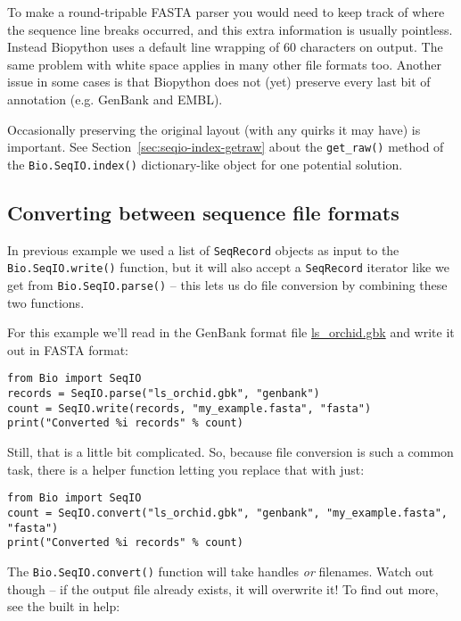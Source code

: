To make a round-tripable FASTA parser you would need to keep track of where the
sequence line breaks occurred, and this extra information is usually pointless.
Instead Biopython uses a default line wrapping of $60$ characters on output.
The same problem with white space applies in many other file formats too.
Another issue in some cases is that Biopython does not (yet) preserve every
last bit of annotation (e.g. GenBank and EMBL).

Occasionally preserving the original layout (with any quirks it may have) is
important. See Section~\ref{sec:seqio-index-getraw} about the \verb|get_raw()|
method of the \verb|Bio.SeqIO.index()| dictionary-like object for one potential
solution.

\subsection{Converting between sequence file formats}
\label{sec:SeqIO-conversion}

In previous example we used a list of \verb|SeqRecord| objects as input to the \verb|Bio.SeqIO.write()| function, but it will also accept a \verb|SeqRecord| iterator like we get from \verb|Bio.SeqIO.parse()| -- this lets us do file conversion by combining these two functions.

For this example we'll read in the GenBank format file \href{https://raw.githubusercontent.com/biopython/biopython/master/Doc/examples/ls_orchid.gbk}{ls\_orchid.gbk} and write it out in FASTA format:

\begin{verbatim}
from Bio import SeqIO
records = SeqIO.parse("ls_orchid.gbk", "genbank")
count = SeqIO.write(records, "my_example.fasta", "fasta")
print("Converted %i records" % count)
\end{verbatim}

Still, that is a little bit complicated. So, because file conversion is such a
common task, there is a helper function letting you replace that with just:

\begin{verbatim}
from Bio import SeqIO
count = SeqIO.convert("ls_orchid.gbk", "genbank", "my_example.fasta", "fasta")
print("Converted %i records" % count)
\end{verbatim}

The \verb|Bio.SeqIO.convert()| function will take handles \emph{or} filenames.
Watch out though -- if the output file already exists, it will overwrite it!
To find out more, see the built in help:

